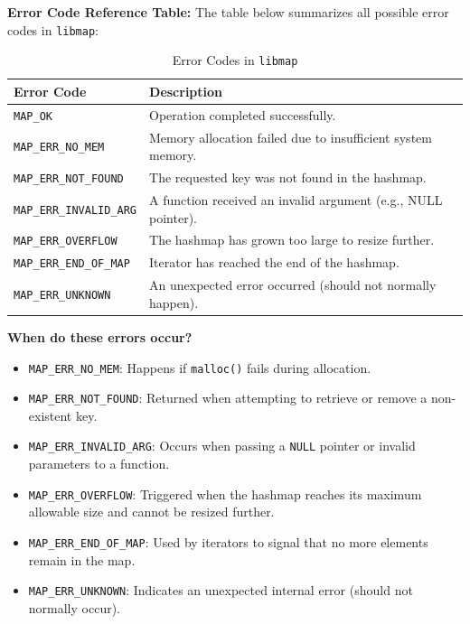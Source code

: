 \documentclass[titlepage]{article}
\begin{document}
\textbf{Error Code Reference Table:}
The table below summarizes all possible error codes in \texttt{libmap}:

\begin{table}[h]
    \centering
    \renewcommand{\arraystretch}{1.3}
    \begin{tabular}{@{} l p{9cm} @{}}
        \toprule
        \textbf{Error Code} & \textbf{Description} \\
        \midrule
        \texttt{MAP\_OK} & Operation completed successfully. \\
        \texttt{MAP\_ERR\_NO\_MEM} & Memory allocation failed due to insufficient system memory. \\
        \texttt{MAP\_ERR\_NOT\_FOUND} & The requested key was not found in the hashmap. \\
        \texttt{MAP\_ERR\_INVALID\_ARG} & A function received an invalid argument (e.g., NULL pointer). \\
        \texttt{MAP\_ERR\_OVERFLOW} & The hashmap has grown too large to resize further. \\
        \texttt{MAP\_ERR\_END\_OF\_MAP} & Iterator has reached the end of the hashmap. \\
        \texttt{MAP\_ERR\_UNKNOWN} & An unexpected error occurred (should not normally happen). \\
        \bottomrule
    \end{tabular}
    \caption{Error Codes in \texttt{libmap}}
\end{table}

\textbf{When do these errors occur?}
\begin{itemize}
    \item \texttt{MAP\_ERR\_NO\_MEM}: Happens if \texttt{malloc()} fails during allocation.
    \item \texttt{MAP\_ERR\_NOT\_FOUND}: Returned when attempting to retrieve or remove a non-existent key.
    \item \texttt{MAP\_ERR\_INVALID\_ARG}: Occurs when passing a \texttt{NULL} pointer or invalid parameters to a function.
    \item \texttt{MAP\_ERR\_OVERFLOW}: Triggered when the hashmap reaches its maximum allowable size and cannot be resized further.
    \item \texttt{MAP\_ERR\_END\_OF\_MAP}: Used by iterators to signal that no more elements remain in the map.
    \item \texttt{MAP\_ERR\_UNKNOWN}: Indicates an unexpected internal error (should not normally occur).
\end{itemize}
\end{document}
